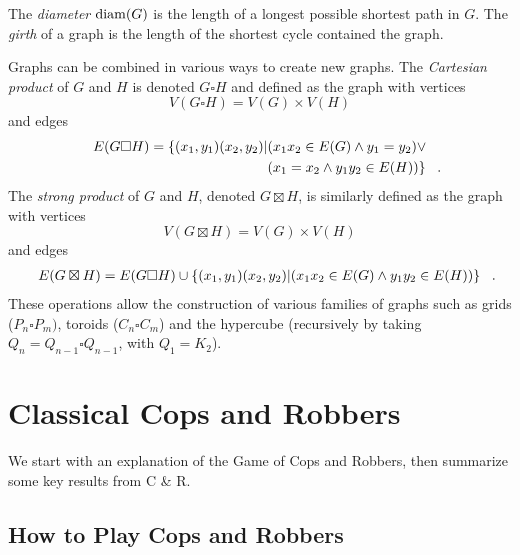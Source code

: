 
The \textit{diameter} $\operatorname{diam}(G)$ is the length of a longest possible shortest path in $G$. The \textit{girth} of a graph is the length of the shortest cycle contained the graph.

Graphs can be combined in various ways to create new graphs.
The \textit{Cartesian product} of $G$ and $H$ is denoted $G \square H$ and defined as the graph with vertices
\[ V(G \square H) = V(G) \times V(H) \]
and edges
\begin{align*}
  E(G \square H) = \{ (x_1,y_1)(x_2,y_2) | &(x_1x_2 \in E(G) \land y_1 = y_2) \lor \\
  & (x_1 = x_2 \land y_1y_2 \in E(H)) \} \mperiod
\end{align*}
The \textit{strong product} of $G$ and $H$, denoted $G \boxtimes H$, is similarly defined as the graph with vertices
\[ V(G \boxtimes H) = V(G) \times V(H) \]
and edges
\begin{align*}
  E(G \boxtimes H) = E(G \square H) \cup \{ (x_1,y_1)(x_2,y_2) | (x_1x_2 \in E(G) \land y_1y_2 \in E(H)) \} \mperiod
\end{align*}
These operations allow the construction of various families of graphs such as grids ($P_n \square P_m)$, toroids ($C_n \square C_m$) and the hypercube (recursively by taking $Q_n = Q_{n - 1} \square Q_{n - 1}$, with $Q_1 = K_2$).

\section{Classical Cops and Robbers}

We start with an explanation of the Game of Cops and Robbers, then summarize some key results from C \& R.

\subsection{How to Play Cops and Robbers}

